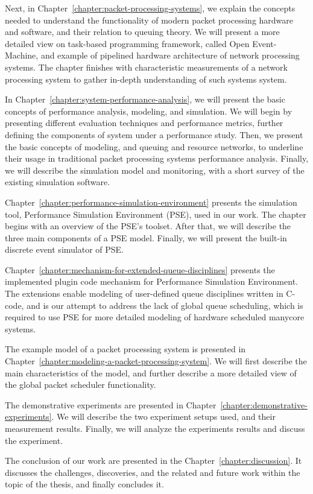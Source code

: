 Next, in Chapter~\ref{chapter:packet-processing-systems}, we explain the concepts needed to understand the functionality of modern packet processing hardware and software, and their relation to queuing theory. We will present a more detailed view on task-based programming framework, called Open Event-Machine, and example of pipelined hardware architecture of network processing systems. The chapter finishes with characteristic measurements of a network processing system to gather in-depth understanding of such systems system.

In Chapter~\ref{chapter:system-performance-analysis}, we will present the basic concepts of performance analysis, modeling, and simulation. We will begin by presenting different evaluation techniques and performance metrics, further defining the components of system under a performance study. Then, we present the basic concepts of modeling, and queuing and resource networks, to underline their usage in traditional packet processing systems performance analysis. Finally, we will describe the simulation model and monitoring, with a short survey of the existing simulation software.

Chapter~\ref{chapter:performance-simulation-environment} presents the simulation tool, Performance Simulation Environment (PSE), used in our work. The chapter begins with an overview of the PSE's toolset. After that, we will describe the three main components of a PSE model. Finally, we will present the built-in discrete event simulator of PSE.

Chapter~\ref{chapter:mechanism-for-extended-queue-disciplines} presents the implemented plugin code mechanism for Performance Simulation Environment. The extensions enable modeling of user-defined queue disciplines written in C-code, and is our attempt to address the lack of global queue scheduling, which is required to use PSE for more detailed modeling of hardware scheduled manycore systems.

The example model of a packet processing system is presented in Chapter~\ref{chapter:modeling-a-packet-processing-system}. We will first describe the main characteristics of the model, and further describe a more detailed view of the global packet scheduler functionality.

The demonstrative experiments are presented in Chapter~\ref{chapter:demonstrative-experiments}. We will describe the two experiment setups used, and their measurement results. Finally, we will analyze the experiments results and discuss the experiment.

The conclusion of our work are presented in the Chapter~\ref{chapter:discussion}. It discusses the challenges, discoveries, and the related and future work within the topic of the thesis, and finally concludes it.

